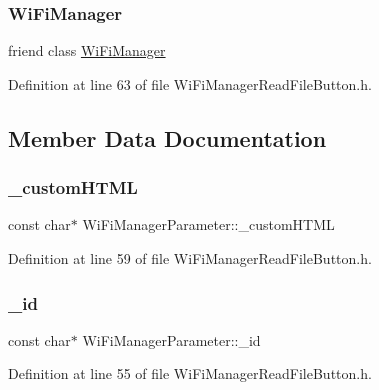 \subsubsection{\texorpdfstring{Wi\+Fi\+Manager}{WiFiManager}}
{\footnotesize\ttfamily friend class \hyperlink{class_wi_fi_manager}{Wi\+Fi\+Manager}\hspace{0.3cm}{\ttfamily [friend]}}



Definition at line 63 of file Wi\+Fi\+Manager\+Read\+File\+Button.\+h.



\subsection{Member Data Documentation}
\mbox{\label{class_wi_fi_manager_parameter_a3823cb117da1a75860cc3e81b0c6f80d}} 
\subsubsection{\texorpdfstring{\+\_\+custom\+H\+T\+ML}{\_customHTML}}
{\footnotesize\ttfamily const char$\ast$ Wi\+Fi\+Manager\+Parameter\+::\+\_\+custom\+H\+T\+ML\hspace{0.3cm}{\ttfamily [private]}}



Definition at line 59 of file Wi\+Fi\+Manager\+Read\+File\+Button.\+h.

\mbox{\label{class_wi_fi_manager_parameter_a2b468d83df6e0714c18a38f09e7996ed}} 
\subsubsection{\texorpdfstring{\+\_\+id}{\_id}}
{\footnotesize\ttfamily const char$\ast$ Wi\+Fi\+Manager\+Parameter\+::\+\_\+id\hspace{0.3cm}{\ttfamily [private]}}



Definition at line 55 of file Wi\+Fi\+Manager\+Read\+File\+Button.\+h.

